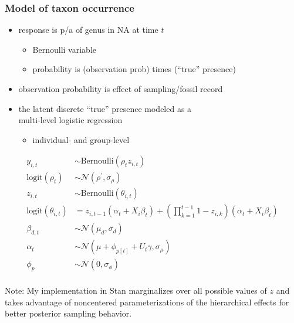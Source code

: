 \documentclass{beamer}
\begin{document}
\begin{frame}
  \frametitle{Model of taxon occurrence}
  \begin{itemize}
    \item response is p/a of genus in NA at time \(t\)
      \begin{itemize}
        \item Bernoulli variable 
        \item probability is (observation prob) times (``true'' presence)
      \end{itemize}
    \item observation probability is effect of sampling/fossil record
    \item the latent discrete ``true'' presence modeled as a \\multi-level logistic regression
      \begin{itemize}
        \item individual- and group-level
      \end{itemize}
  \end{itemize}
\end{frame}

\begin{frame}
  \begin{equation}
    \begin{aligned}
      y_{i,t} &\sim \text{Bernoulli}(\rho_{t} z_{i,t}) \\
      \text{logit}(\rho_{t}) &\sim \mathcal{N}(\rho^{'}, \sigma_{\rho}) \\
      z_{i,t} &\sim \text{Bernoulli}(\theta_{i, t}) \\
      \text{logit}(\theta_{i, t}) &= z_{i,t-1} (\alpha_{t} + X_{i} \beta_{t}) + (\prod_{k = 1}^{t-1} 1 - z_{i,k}) (\alpha_{t} + X_{i} \beta_{t}) \\
      \beta_{d,t} &\sim \mathcal{N}(\mu_{d}, \sigma_{d}) \\
      \alpha_{t} &\sim \mathcal{N}(\mu + \phi_{p[t]} + U_{t} \gamma, \sigma_{\mu}) \\
      \phi_{p} &\sim \mathcal{N}(0, \sigma_{\phi}) \\
    \end{aligned}
  \end{equation}

  Note: My implementation in Stan marginalizes over all possible values of \(z\) and takes advantage of noncentered parameterizations of the hierarchical effects for better posterior sampling behavior.
\end{frame}
\end{document}
